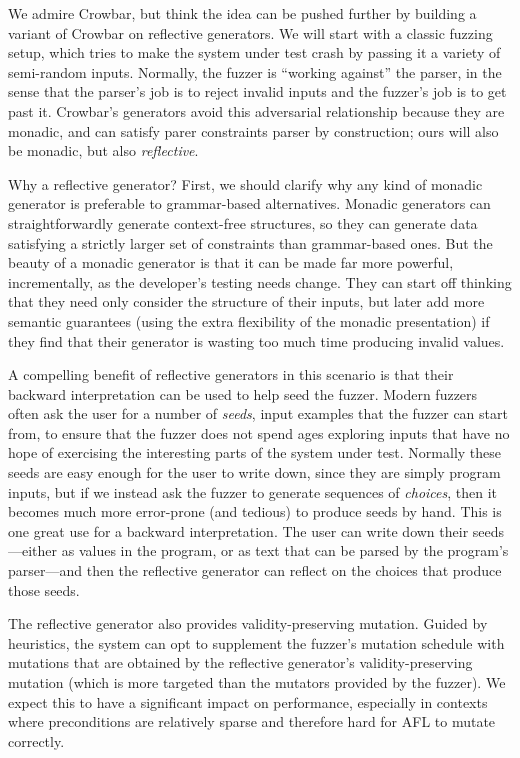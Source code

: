 We admire Crowbar, but think the idea can be pushed further by building
a variant of Crowbar on reflective generators.
We will start with a classic fuzzing setup, which tries to make the
system under test
crash by passing it a variety of semi-random inputs. Normally, the fuzzer is
``working against'' the parser, in the sense that the parser's job is to reject
invalid inputs and the fuzzer's job is to get past it.  Crowbar's
generators avoid this adversarial relationship because they are
monadic, and can satisfy parer constraints
parser by construction; ours will also be monadic, but also {\em reflective}.

Why a reflective generator? First, we should clarify why any kind of monadic
generator is preferable to grammar-based alternatives. Monadic generators can
straightforwardly generate context-free structures, so they can generate data
satisfying a strictly larger set of constraints than grammar-based ones.
But the beauty of a monadic
generator is that it can be made far more powerful, incrementally, as the
developer's testing needs change. They can start off thinking that they
need only consider the structure of their inputs, but later add more
semantic guarantees (using the extra flexibility of the monadic
presentation) if they find that their generator is wasting too much time
producing invalid values.

A compelling benefit of reflective generators in this scenario is that
their backward interpretation can be used to help seed the fuzzer.
Modern fuzzers often
ask the user for a number of {\em seeds}, input examples that the fuzzer can start from,
to ensure that the fuzzer does not spend ages exploring
inputs that have no hope of exercising the interesting parts of the
system under test. Normally these seeds are easy enough
for the user to write down, since they are simply program inputs, but if
we instead ask the fuzzer to generate sequences of {\em choices}, then
it becomes much more
error-prone (and tedious) to produce seeds by hand.  This is one great use for a
backward interpretation. The user can write down their seeds---either as values
in the program, or as text that can be parsed by the program's parser---and then
the reflective generator can reflect on the choices that produce those seeds.

The reflective generator also provides validity-preserving mutation. Guided by
heuristics, the system can opt to supplement the fuzzer's mutation schedule with
mutations that are obtained by the reflective generator's validity-preserving
mutation (which is more targeted than the mutators provided by the fuzzer). We
expect this to have a significant impact on performance, especially in contexts
where preconditions are relatively sparse and therefore hard for AFL to mutate
correctly.

